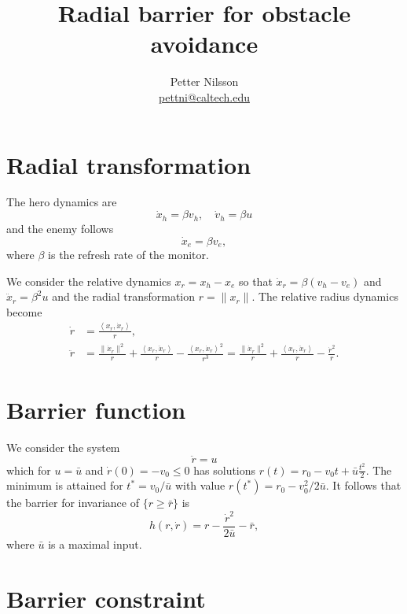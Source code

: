 \documentclass[letterpaper, 12pt]{article}
\title{Radial barrier for obstacle avoidance}
\author{Petter Nilsson \\ \href{mailto:pettni@caltech.edu}{pettni@caltech.edu}}
\begin{document}
\maketitle

\section{Radial transformation}

The hero dynamics are
\begin{equation}
	\dot x_h = \beta v_h, \quad \dot v_h = \beta u
\end{equation}
and the enemy follows
\begin{equation}
	\dot x_e = \beta v_e,
\end{equation}
where $\beta$ is the refresh rate of the monitor.

We consider the relative dynamics $x_r = x_h - x_e$ so that $\dot x_r = \beta (v_h - v_e)$ and $\ddot x_r = \beta^2 u$ and the radial transformation $r = \| x_r \|$. The relative radius dynamics become
\begin{equation}
\begin{aligned}
	\dot r & = \frac{\left\langle x_r, \dot x_r \right\rangle}{r}, \\
	\ddot r & = \frac{\| \dot x_r \|^2}{r} + \frac{\left\langle x_r, \ddot x_r \right\rangle}{r} - \frac{\left\langle x_r, \dot x_r \right\rangle^2}{r^3} = \frac{\| \dot x_r \|^2}{r} + \frac{\left\langle x_r, \ddot x_r \right\rangle}{r} - \frac{\dot r^2}{r}.
\end{aligned}
\end{equation}


\section{Barrier function}

We consider the system
\begin{equation}
	\ddot r = u
\end{equation}
which for $u = \bar u$ and $\dot r(0) = -v_0 \leq 0$ has solutions $r(t) = r_0 - v_0 t + \bar u\frac{t^2}{2}$. The minimum is attained for $t^* = v_0/\bar u$ with value $r(t^*) = r_0 -  v_0^2/2 \bar u$. It follows that the barrier for invariance of $\{ r \geq \bar r \}$ is 
\begin{equation}
	h(r, \dot r) = r - \frac{\dot r^2}{2 \bar u} - \bar r,
\end{equation}
where $\bar u$ is a maximal input.

\section{Barrier constraint}
\end{document}
